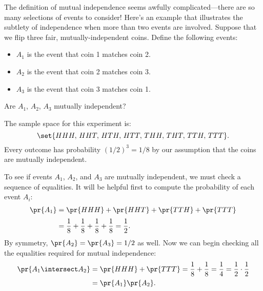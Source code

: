 The definition of mutual independence seems awfully
complicated---there are so many selections of events to consider!
Here's an example that illustrates the subtlety of independence when
more than two events are involved.  Suppose that we flip three fair,
mutually-independent coins.  Define the following events:
%
\begin{itemize}
\item $A_1$ is the event that coin 1 matches coin 2.
\item $A_2$ is the event that coin 2 matches coin 3.
\item $A_3$ is the event that coin 3 matches coin 1.
\end{itemize}
%
Are $A_1$, $A_2$, $A_3$ mutually independent?

The sample space for this experiment is:
%
\[
    \set{HHH,\, HHT,\, HTH,\, HTT,\, THH,\, THT,\, TTH,\, TTT}.
\]
%
Every outcome has probability $(1/2)^3 = 1/8$ by our assumption that
the coins are mutually independent.

To see if events $A_1$, $A_2$, and $A_3$ are mutually independent, we
must check a sequence of equalities.  It will be helpful first to
compute the probability of each event $A_i$:
%
\begin{align*}
\pr{A_1} & = \pr{HHH} + \pr{HHT} + \pr{TTH} + \pr{TTT} \\[2pt]
         & = \frac{1}{8} + \frac{1}{8} + \frac{1}{8} + \frac{1}{8}%
          = \frac{1}{2}.
\end{align*}
%
By symmetry, $\pr{A_2} = \pr{A_3} = 1/2$ as well.  Now we can begin
checking all the equalities required for mutual independence:
\begin{align*}
\pr{A_1 \intersect A_2}
       & = \pr{HHH} + \pr{TTT}
         = \frac{1}{8} + \frac{1}{8}
         = \frac{1}{4}
         = \frac{1}{2} \cdot \frac{1}{2}\\
       & = \pr{A_1} \pr{A_2}.
\end{align*}

\iffalse
\begin{align*}
\pr{A_1 \intersect A_2}
	& = \pr{HHH} + \pr{TTT} \\[2pt]
        & = \frac{1}{8} + \frac{1}{8} \\[2pt]
        & = \frac{1}{4} \\[2pt]
        & = \frac{1}{2} \cdot \frac{1}{2}\\[2pt]
        & = \pr{A_1} \pr{A_2}.
\end{align*}\fi

